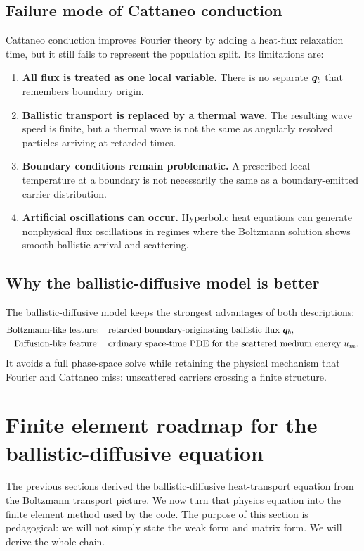 \documentclass[11pt]{article}
\begin{document}
\subsection{Failure mode of Cattaneo conduction}
Cattaneo conduction improves Fourier theory by adding a heat-flux relaxation time, but it still fails to represent the population split. Its limitations are:
\begin{enumerate}[leftmargin=1.6em]
    \item \textbf{All flux is treated as one local variable.} There is no separate \(\bm{q}_b\) that remembers boundary origin.
    \item \textbf{Ballistic transport is replaced by a thermal wave.} The resulting wave speed is finite, but a thermal wave is not the same as angularly resolved particles arriving at retarded times.
    \item \textbf{Boundary conditions remain problematic.} A prescribed local temperature at a boundary is not necessarily the same as a boundary-emitted carrier distribution.
    \item \textbf{Artificial oscillations can occur.} Hyperbolic heat equations can generate nonphysical flux oscillations in regimes where the Boltzmann solution shows smooth ballistic arrival and scattering.
\end{enumerate}

\subsection{Why the ballistic-diffusive model is better}
The ballistic-diffusive model keeps the strongest advantages of both descriptions:
\begin{align}
    \text{Boltzmann-like feature:} &\quad \text{retarded boundary-originating ballistic flux } \bm{q}_b,\\
    \text{Diffusion-like feature:} &\quad \text{ordinary space-time PDE for the scattered medium energy } u_m.
\end{align}
It avoids a full phase-space solve while retaining the physical mechanism that Fourier and Cattaneo miss: unscattered carriers crossing a finite structure.


\section{Finite element roadmap for the ballistic-diffusive equation}
The previous sections derived the ballistic-diffusive heat-transport equation from the Boltzmann transport picture. We now turn that physics equation into the finite element method used by the code. The purpose of this section is pedagogical: we will not simply state the weak form and matrix form. We will derive the whole chain.
\end{document}
